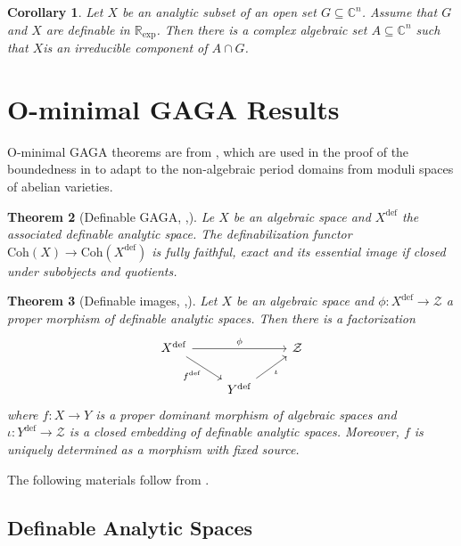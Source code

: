 \documentclass{amsart}
\newtheorem{theorem}{Theorem}[subsection]
\newtheorem{corollary}[theorem]{Corollary}
\theoremstyle{definition}
\numberwithin{equation}{section}
\newcommand{\definable}{\mathrm{def}}
\begin{document}
\begin{corollary}
	Let $X$ be an analytic subset of an open set $G\subseteq \mathbb{C}^n$.
	Assume that $G$ and $X$ are definable in $\mathbb{R}_{\exp}$.
	Then there is a complex algebraic set $A\subseteq \mathbb{C}^n$ such that $X $is an irreducible component of $A\cap G$.
\end{corollary}

\section{O-minimal GAGA Results}
O-minimal GAGA theorems are from \cite{zbMATH07662555},
which are used in the proof of the boundedness in \cite{arXiv:2507.00973,arXiv:2508.19215}
to adapt to the non-algebraic period domains from moduli spaces of abelian varieties.

\begin{tcolorbox}[title = {\bfseries\Large Main results}]
	\begin{theorem}[{Definable GAGA, \cite[Theorem 2.1]{arXiv:2508.19215},\cite[Theorem 1.4]{zbMATH07662555}}]
		Le $X$ be an algebraic space and $X^{\definable}$ the associated definable analytic space.
		The definabilization functor $\mathrm{Coh}(X) \to \mathrm{Coh}(X^{\definable})$ is fully faithful, exact and
		its essential image if closed under subobjects and quotients.
	\end{theorem}

	\begin{theorem}[{Definable images, \cite[Theorem 2.2]{arXiv:2508.19215},\cite[Theorem 1.3]{zbMATH07662555}}]
		\label{def image}
		Let $X$ be an algebraic space and
		$\phi: X^{\definable} \to \mathcal{Z}$ a proper morphism of definable analytic spaces.
		Then there is a factorization
		\[\begin{tikzcd}
				X^{\definable}\ar[rr,"\phi"]\ar[dr,"f^{\definable}"'] & & \mathcal{Z} \\
				& Y^{\definable}\ar[ur,"\iota"'] &
			\end{tikzcd}\]
		where $f: X\to Y$ is a proper dominant morphism of algebraic spaces and
		$\iota: Y^{\definable} \to \mathcal{Z}$ is a closed embedding of definable analytic spaces.
		Moreover, $f$ is uniquely determined as a morphism with fixed source.
	\end{theorem}
\end{tcolorbox}

The following materials follow from \cite{zbMATH07662555}.

\subsection{Definable Analytic Spaces}
\end{document}

